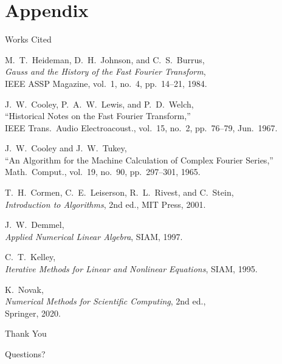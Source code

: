 \documentclass[12pt]{beamer}
\begin{document}
\section{Appendix}

\begin{frame}[allowframebreaks]{Works Cited}
\begin{thebibliography}{9}
    M.~T.~Heideman, D.~H.~Johnson, and C.~S.~Burrus,\\
    \emph{Gauss and the History of the Fast Fourier Transform},\\
    IEEE ASSP Magazine, vol.~1, no.~4, pp.~14–21, 1984.

    J.~W.~Cooley, P.~A.~W.~Lewis, and P.~D.~Welch,\\
    “Historical Notes on the Fast Fourier Transform,”\\
    IEEE Trans.\ Audio Electroacoust., vol.~15, no.~2, pp.~76–79, Jun.\ 1967.

    J.~W.~Cooley and J.~W.~Tukey,\\
    “An Algorithm for the Machine Calculation of Complex Fourier Series,”\\
    Math.\ Comput., vol.~19, no.~90, pp.~297–301, 1965.

    T.~H.~Cormen, C.~E.~Leiserson, R.~L.~Rivest, and C.~Stein,\\
    \emph{Introduction to Algorithms}, 2nd ed., MIT Press, 2001.

    J.~W.~Demmel,\\
    \emph{Applied Numerical Linear Algebra}, SIAM, 1997.

    C.~T.~Kelley,\\
    \emph{Iterative Methods for Linear and Nonlinear Equations}, SIAM, 1995.

    K.~Novak,\\
    \emph{Numerical Methods for Scientific Computing}, 2nd ed.,\\
    Springer, 2020.
\end{thebibliography}
\end{frame}


\begin{frame}{Thank You}
  \begin{center}
    Questions?
  \end{center}
\end{frame}
\end{document}
